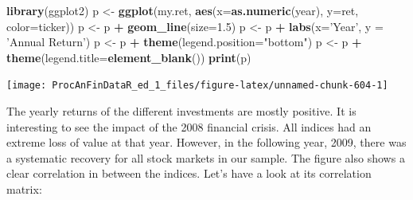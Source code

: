 \documentclass[11pt,]{book}
\newenvironment{Shaded}{\begin{snugshade}}{\end{snugshade}}
\newcommand{\KeywordTok}[1]{\textcolor[rgb]{0.27,0.27,0.27}{\textbf{#1}}}
\newcommand{\DataTypeTok}[1]{\textcolor[rgb]{0.27,0.27,0.27}{#1}}
\newcommand{\FloatTok}[1]{\textcolor[rgb]{0.06,0.06,0.06}{#1}}
\newcommand{\StringTok}[1]{\textcolor[rgb]{0.5,0.5,0.5}{#1}}
\newcommand{\CommentTok}[1]{\textcolor[rgb]{0.56,0.35,0.01}{\textit{#1}}}
\newcommand{\OtherTok}[1]{\textcolor[rgb]{0.56,0.35,0.01}{#1}}
\newcommand{\OperatorTok}[1]{\textcolor[rgb]{0.81,0.36,0.00}{\textbf{#1}}}
\newcommand{\NormalTok}[1]{#1}
\begin{document}
\begin{Shaded}
\begin{Highlighting}[]
\KeywordTok{library}\NormalTok{(ggplot2)}
\NormalTok{p <-}\StringTok{ }\KeywordTok{ggplot}\NormalTok{(my.ret, }\KeywordTok{aes}\NormalTok{(}\DataTypeTok{x=}\KeywordTok{as.numeric}\NormalTok{(year), }
                        \DataTypeTok{y=}\NormalTok{ret, }
                        \DataTypeTok{color=}\NormalTok{ticker))}
\NormalTok{p <-}\StringTok{ }\NormalTok{p }\OperatorTok{+}\StringTok{ }\KeywordTok{geom_line}\NormalTok{(}\DataTypeTok{size=}\FloatTok{1.5}\NormalTok{)}
\NormalTok{p <-}\StringTok{ }\NormalTok{p }\OperatorTok{+}\StringTok{ }\KeywordTok{labs}\NormalTok{(}\DataTypeTok{x=}\StringTok{'Year'}\NormalTok{, }\DataTypeTok{y =} \StringTok{'Annual Return'}\NormalTok{)}
\NormalTok{p <-}\StringTok{ }\NormalTok{p }\OperatorTok{+}\StringTok{ }\KeywordTok{theme}\NormalTok{(}\DataTypeTok{legend.position=}\StringTok{"bottom"}\NormalTok{)}
\NormalTok{p <-}\StringTok{ }\NormalTok{p }\OperatorTok{+}\StringTok{ }\KeywordTok{theme}\NormalTok{(}\DataTypeTok{legend.title=}\KeywordTok{element_blank}\NormalTok{())}
\KeywordTok{print}\NormalTok{(p)}
\end{Highlighting}
\end{Shaded}

\begin{center}\texttt{[image: ProcAnFinDataR\_ed\_1\_files/figure-latex/unnamed-chunk-604-1]} \end{center}

The yearly returns of the different investments are mostly positive. It
is interesting to see the impact of the 2008 financial crisis. All
indices had an extreme loss of value at that year. However, in the
following year, 2009, there was a systematic recovery for all stock
markets in our sample. The figure also shows a clear correlation in
between the indices. Let's have a look at its correlation matrix:

\begin{Shaded}
\end{Shaded}
\end{document}

